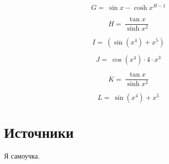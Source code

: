 \documentclass[a4paper, 12pt]{article}
\begin{document}
            \begin{equation}
            G =~ \sin x -  \cosh x ^ {H - 1}
            \end{equation}
            
            \begin{equation}
            H =~\dfrac{ \tan x }{  \sinh x ^ {2}}
            \end{equation}
            
            \begin{equation}
            I =~( \sin (x ^ {4}) + x ^ {5})
            \end{equation}
            
            \begin{equation}
            J =~ \cos (x ^ {4}) \cdot 4 \cdot x ^ {3}
            \end{equation}
            
            \begin{equation}
            K =~\dfrac{ \tan x }{  \sinh x ^ {2}}
            \end{equation}
            
            \begin{equation}
            L =~ \sin (x ^ {4}) + x ^ {5}
            \end{equation}
            
    \section{Источники}
    Я самоучка.
    
    
\end{document}
